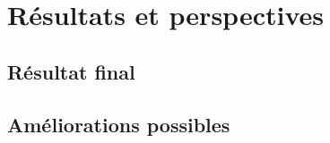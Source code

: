 \section{Résultats et perspectives}
	\subsection{Résultat final}
	
	\subsection{Améliorations possibles}